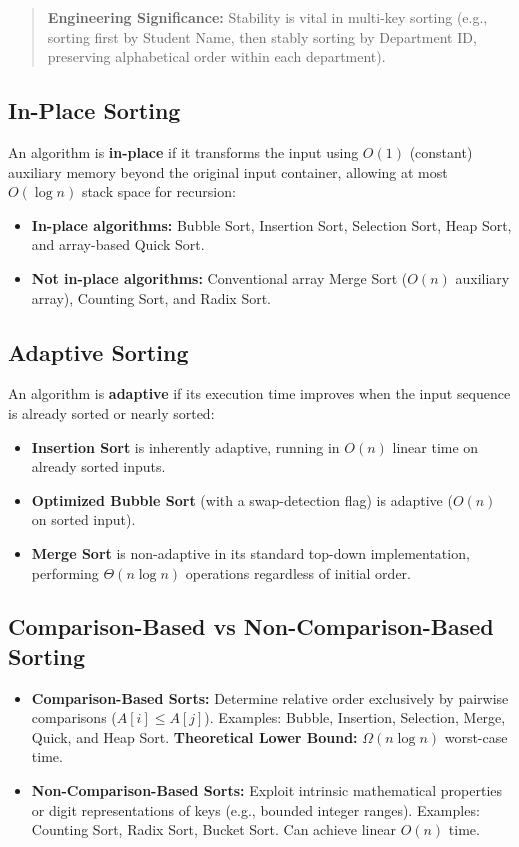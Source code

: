 \begin{quote}
\textbf{Engineering Significance:} Stability is vital in multi-key sorting (e.g., sorting first by Student Name, then stably sorting by Department ID, preserving alphabetical order within each department).
\end{quote}

\subsection{In-Place Sorting}

An algorithm is \textbf{in-place} if it transforms the input using $O(1)$ (constant) auxiliary memory beyond the original input container, allowing at most $O(\log n)$ stack space for recursion:
\begin{itemize}
    \item \textbf{In-place algorithms:} Bubble Sort, Insertion Sort, Selection Sort, Heap Sort, and array-based Quick Sort.
    \item \textbf{Not in-place algorithms:} Conventional array Merge Sort ($O(n)$ auxiliary array), Counting Sort, and Radix Sort.
\end{itemize}

\subsection{Adaptive Sorting}

An algorithm is \textbf{adaptive} if its execution time improves when the input sequence is already sorted or nearly sorted:
\begin{itemize}
    \item \textbf{Insertion Sort} is inherently adaptive, running in $O(n)$ linear time on already sorted inputs.
    \item \textbf{Optimized Bubble Sort} (with a swap-detection flag) is adaptive ($O(n)$ on sorted input).
    \item \textbf{Merge Sort} is non-adaptive in its standard top-down implementation, performing $\Theta(n \log n)$ operations regardless of initial order.
\end{itemize}

\subsection{Comparison-Based vs Non-Comparison-Based Sorting}

\begin{itemize}
    \item \textbf{Comparison-Based Sorts:} Determine relative order exclusively by pairwise comparisons ($A[i] \leq A[j]$). Examples: Bubble, Insertion, Selection, Merge, Quick, and Heap Sort. \textbf{Theoretical Lower Bound:} $\Omega(n \log n)$ worst-case time.
    \item \textbf{Non-Comparison-Based Sorts:} Exploit intrinsic mathematical properties or digit representations of keys (e.g., bounded integer ranges). Examples: Counting Sort, Radix Sort, Bucket Sort. Can achieve linear $O(n)$ time.
\end{itemize}

